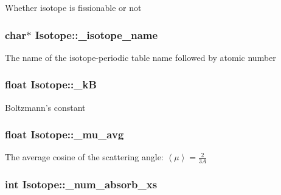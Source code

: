 Whether isotope is fissionable or not \hypertarget{classIsotope_a073b0f7a2c59a676284d68dbdc588a6b}{
\subsubsection[{\-\_\-isotope\-\_\-name}]{\setlength{\rightskip}{0pt plus 5cm}char$\ast$ Isotope\-::\-\_\-isotope\-\_\-name\hspace{0.3cm}{\ttfamily [private]}}}\label{classIsotope_a073b0f7a2c59a676284d68dbdc588a6b}
The name of the isotope-\/periodic table name followed by atomic number \hypertarget{classIsotope_a9ca004efbe18d4777529a7ae2c499e4b}{
\subsubsection[{\-\_\-k\-B}]{\setlength{\rightskip}{0pt plus 5cm}float Isotope\-::\-\_\-k\-B\hspace{0.3cm}{\ttfamily [private]}}}\label{classIsotope_a9ca004efbe18d4777529a7ae2c499e4b}
Boltzmann's constant \hypertarget{classIsotope_aa56de3d2e8a5ae51aec90e202abfac14}{
\subsubsection[{\-\_\-mu\-\_\-avg}]{\setlength{\rightskip}{0pt plus 5cm}float Isotope\-::\-\_\-mu\-\_\-avg\hspace{0.3cm}{\ttfamily [private]}}}\label{classIsotope_aa56de3d2e8a5ae51aec90e202abfac14}
The average cosine of the scattering angle\-: $ \left<\mu\right> = \frac{2}{3A} $ \hypertarget{classIsotope_aa197f9184aae95b37bcfb89c6c456a8f}{
\subsubsection[{\-\_\-num\-\_\-absorb\-\_\-xs}]{\setlength{\rightskip}{0pt plus 5cm}int Isotope\-::\-\_\-num\-\_\-absorb\-\_\-xs\hspace{0.3cm}{\ttfamily [private]}}}\label{classIsotope_aa197f9184aae95b37bcfb89c6c456a8f}
